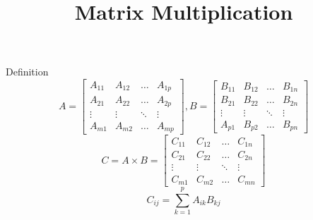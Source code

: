 \documentclass[xcolor=dvipsnames]{beamer}
\begin{document}
	\title[Matrix Multiplication]{Matrix Multiplication}
	\author[]{\className}
	\institute[\className]{\departmentName}
	\date{} 


	\begin{frame}
		\maketitle
	\end{frame}
	

	\begin{frame}{Definition}
		\begin{equation*}
			A =
			\begin{bmatrix}
				A_{11} & A_{12} & \ldots & A_{1p} \\
				A_{21} & A_{22} & \ldots & A_{2p} \\
				\vdots & \vdots & \ddots & \vdots \\
				A_{m1} & A_{m2} & \ldots & A_{mp}
			\end{bmatrix}, 
			B =
			\begin{bmatrix}
				B_{11} & B_{12} & \ldots & B_{1n} \\
				B_{21} & B_{22} & \ldots & B_{2n} \\
				\vdots & \vdots & \ddots & \vdots \\
				A_{p1} & B_{p2} & \ldots & B_{pn}
			\end{bmatrix}
		\end{equation*}
		\begin{equation*}
			C = A \times B = 
			\begin{bmatrix}
				C_{11} & C_{12} & \ldots & C_{1n} \\
				C_{21} & C_{22} & \ldots & C_{2n} \\
				\vdots & \vdots & \ddots & \vdots \\
				C_{m1} & C_{m2} & \ldots & C_{mn}
			\end{bmatrix}
		\end{equation*}
		\begin{equation*}
			C_{ij} = \sum_{k=1}^p{A_{ik}B_{kj}}
		\end{equation*}
	\end{frame}

\end{document}

